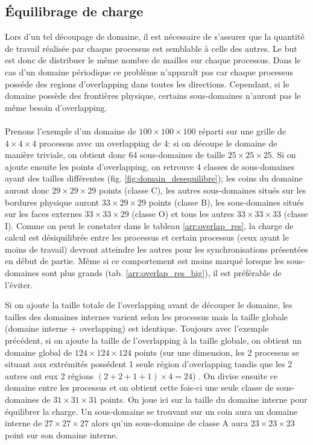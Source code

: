\subsection{Équilibrage de charge}
Lors d'un tel découpage de domaine, il est nécessaire de s'assurer que la quantité de travail réalisée par chaque processus est semblable à celle des autres. Le but est donc de distribuer le même nombre de mailles sur chaque processus. Dans le cas d'un domaine périodique ce problème n'apparaît pas car chaque processus posséde des regions d'overlapping dans toutes les directions. Cependant, si le domaine possède des frontières physique, certains sous-domaines n'auront pas le même besoin d'overlapping.

\paragraph{}Prenons l'exemple d'un domaine de $100\times100\times100$ réparti sur une grille de $4\times4\times4$ processus avec un overlapping de 4: si on découpe le domaine de manière triviale, on obtient donc 64 sous-domaines de taille $25\times25\times25$. Si on ajoute ensuite les points d'overlapping, on retrouve 4 classes de sous-domaines ayant des tailles différentes (fig. \ref{fig:domain_desequilibre}); les coins du domaine auront donc $29\times29\times29$ points (classe C), les autres sous-domaines situés sur les bordures physique auront $33\times29\times29$ points (classe B), les sous-domaines situés sur les faces externes $33\times33\times29$ (classe O) et tous les autres $33\times33\times33$ (classe I). Comme on peut le constater dans le tableau \ref{arr:overlap_res}, la charge de calcul est désiquilibrée entre les processus et certain processus (ceux ayant le moins de travail) devront atteindre les autres pour les synchronisations présentées en début de partie. Même si ce comportement est moins marqué lorsque les sous-domaines sont plus grands (tab. \ref{arr:overlap_res_big}), il est préférable de l'éviter.
  
Si on ajoute la taille totale de l'overlapping avant de découper le domaine, les tailles des domaines internes varient selon les processus mais la taille globale (domaine interne + overlapping) est identique. Toujours avec l'exemple précédent, si on ajoute la taille de l'overlapping à la taille globale, on obtient un domaine global de $124\times124\times124$ points (sur une dimension, les 2 processus se situant aux extrémités possédent 1 seule région d'overlapping tandis que les 2 autres ont eux 2 régions $(2+2+1+1)\times4=24$) . On divise ensuite ce domaine entre les processus et on obtient cette fois-ci une seule classe de sous-domaines de $31\times31\times31$ points. On joue ici sur la taille du domaine interne pour équilibrer la charge. Un sous-domaine se trouvant sur un coin aura un domaine interne de $27\times27\times27$ alors qu'un sous-domaine de classe A aura $23\times23\times23$ point sur son domaine interne.


